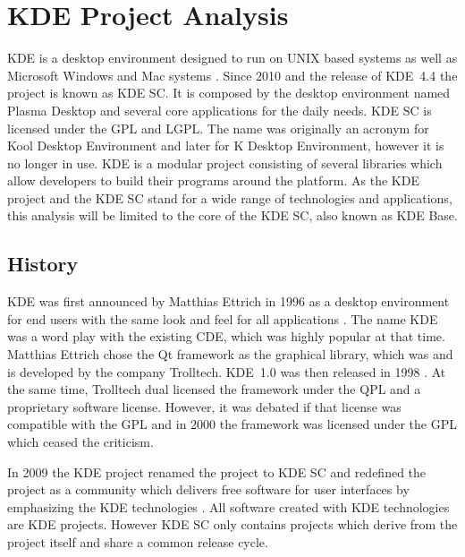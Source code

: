 \section{KDE Project Analysis} %


KDE is a desktop environment designed to run on UNIX based systems as well as
Microsoft Windows and Mac  systems \cite{KDEPress,KDEAbout}.
Since 2010 and the release of KDE~4.4 the project is known as \ac{KDE SC}. It
is composed by the desktop environment named Plasma Desktop and several core
applications for the daily needs. \ac{KDE SC} is licensed under the \ac{GPL}
and \ac{LGPL}. The name was originally an acronym for Kool Desktop Environment
and later for K Desktop Environment, however it is no longer in use. KDE is a
modular project consisting of several libraries which allow developers to build
their programs around the platform. As the KDE project and the \ac{KDE SC}
stand for a wide range of technologies and applications, this analysis will be
limited to the core of the \ac{KDE SC}, also known as KDE Base.

\subsection{History} %

KDE was first announced by Matthias Ettrich in 1996 as a desktop environment
for end users with the same look and feel for all applications
\cite{KDEAnnouncement}. The name KDE was a word play with the existing
\ac{CDE}, which was highly popular at that time. Matthias Ettrich chose the Qt
framework as the graphical library, which was and is developed by the company
Trolltech. KDE~1.0 was then released in 1998 \cite{KDEHistory}. At the same
time, Trolltech dual licensed the framework under the \ac{QPL} and a
proprietary software license. However, it was debated if that license was
compatible with the \ac{GPL} and in 2000 the framework was licensed under the
\ac{GPL} which ceased the criticism.

In 2009 the KDE project renamed the project to \ac{KDE SC} and redefined the
project as a community which delivers free software for user interfaces by
emphasizing the KDE technologies \cite{KDESC}. All software created with KDE
technologies are KDE projects. However \ac{KDE SC} only contains projects which
derive from the project itself and share a common release cycle.

